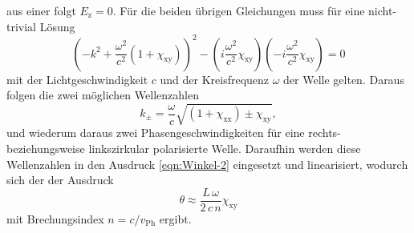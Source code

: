 \documentclass[
  bibliography=totoc,     %
  captions=tableheading,  %
  titlepage=firstiscover, %
]{scrartcl}
\begin{document}
aus einer folgt $E_\text{z} = 0$.
Für die beiden übrigen Gleichungen muss für eine nicht-trivial Lösung
\begin{equation*}
  \left(- k^2 + \frac{\omega^2}{c^2} \left(1 + \chi_\text{xy}\right)\right)^2
  -\left(i \frac{\omega^2}{c^2} \chi_\text{xy}\right)
  \left(- i \frac{\omega^2}{c^2} \chi_\text{xy}\right)
  = 0
\end{equation*}
mit der Lichtgeschwindigkeit $c$ und der Kreisfrequenz $\omega$
der Welle gelten.
Daraus folgen die zwei möglichen Wellenzahlen
\begin{equation*}
  k_\pm = \frac{\omega}{c} \sqrt{\left(1 + \chi_\text{xx}\right) \pm \chi_\text{xy}},
\end{equation*}
und wiederum daraus zwei Phasengeschwindigkeiten
für eine rechts- beziehungsweise linkszirkular polarisierte Welle.
Daraufhin werden diese Wellenzahlen in den Ausdruck \eqref{eqn:Winkel-2}
eingesetzt und linearisiert, wodurch sich der der Ausdruck
\begin{equation}
  \theta \approx \frac{L \, \omega}{2 \, c \, n} \chi_\text{xy}
  \label{eqn:Winkel-1}
\end{equation}
mit Brechungsindex $n = c / v_\text{Ph}$ ergibt.
\end{document}
